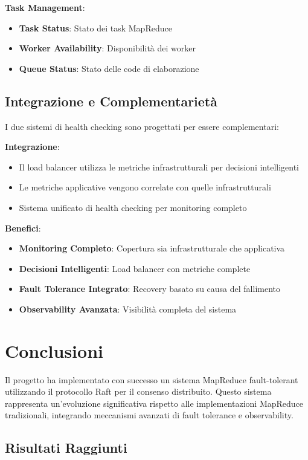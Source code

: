 \documentclass[12pt,a4paper]{article}
\begin{document}
\textbf{Task Management}:
\begin{itemize}
\item \textbf{Task Status}: Stato dei task MapReduce
\item \textbf{Worker Availability}: Disponibilità dei worker
\item \textbf{Queue Status}: Stato delle code di elaborazione
\end{itemize}

\subsection{Integrazione e Complementarietà}

I due sistemi di health checking sono progettati per essere complementari:

\textbf{Integrazione}:
\begin{itemize}
\item Il load balancer utilizza le metriche infrastrutturali per decisioni intelligenti
\item Le metriche applicative vengono correlate con quelle infrastrutturali
\item Sistema unificato di health checking per monitoring completo
\end{itemize}

\textbf{Benefici}:
\begin{itemize}
\item \textbf{Monitoring Completo}: Copertura sia infrastrutturale che applicativa
\item \textbf{Decisioni Intelligenti}: Load balancer con metriche complete
\item \textbf{Fault Tolerance Integrato}: Recovery basato su causa del fallimento
\item \textbf{Observability Avanzata}: Visibilità completa del sistema
\end{itemize}

\section{Conclusioni}

Il progetto ha implementato con successo un sistema MapReduce fault-tolerant utilizzando il protocollo Raft per il consenso distribuito. Questo sistema rappresenta un'evoluzione significativa rispetto alle implementazioni MapReduce tradizionali, integrando meccanismi avanzati di fault tolerance e observability.

\subsection{Risultati Raggiunti}
\end{document}
